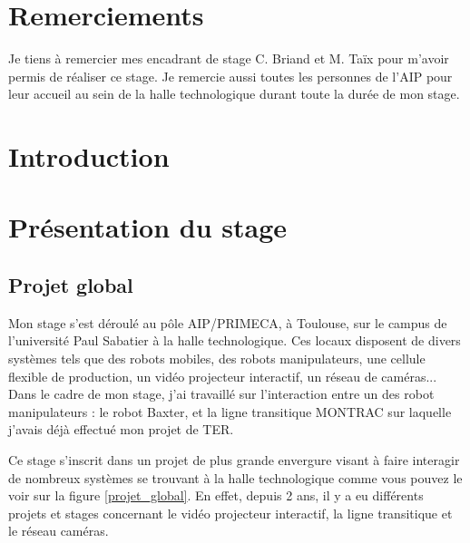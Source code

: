 \documentclass[a4paper,french, titlepage]{book}
\begin{document}
\newpage
{}
\chapter*{Remerciements}

\vspace{5cm}

Je tiens à remercier mes encadrant de stage C. Briand et M. Taïx pour m'avoir permis de réaliser ce stage. Je remercie aussi toutes les personnes de l'AIP pour leur accueil au sein de la halle technologique durant toute la durée de mon stage.

\newpage
\renewcommand{\contentsname}{Sommaire} %
\tableofcontents %


\newpage
{}
\chapter*{Introduction}


\newpage
\chapter{Présentation du stage}

\section{Projet global}

\vspace{1cm}

Mon stage s'est déroulé au pôle AIP/PRIMECA, à Toulouse, sur le campus de l'université Paul Sabatier à la halle technologique. Ces locaux disposent de divers systèmes tels que des robots mobiles, des robots manipulateurs, une cellule flexible de production, un vidéo projecteur interactif, un réseau de caméras... Dans le cadre de mon stage, j'ai travaillé sur l'interaction entre un des robot manipulateurs : le robot Baxter, et la ligne transitique MONTRAC sur laquelle j'avais déjà effectué mon projet de TER.\\

\vspace{1cm}

Ce stage s'inscrit dans un projet de plus grande envergure visant à faire interagir de nombreux systèmes se trouvant à la halle technologique comme vous pouvez le voir sur la figure \ref{projet_global}. En effet, depuis 2 ans, il y a eu différents projets et stages concernant le vidéo projecteur interactif, la ligne transitique et le réseau caméras. 
\end{document}
